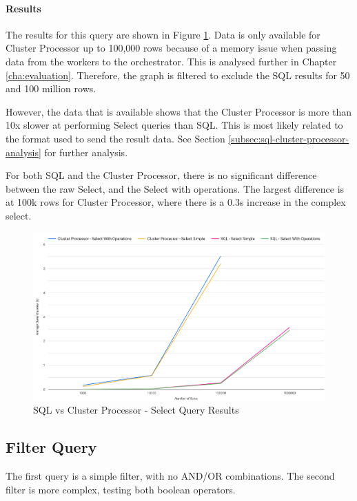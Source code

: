 \paragraph{Results} The results for this query are shown in Figure \ref{fig:select-graph}. Data is only available for Cluster Processor up to 100,000 rows because of a memory issue when passing data from the workers to the orchestrator. This is analysed further in Chapter \ref{cha:evaluation}. Therefore, the graph is filtered to exclude the SQL results for 50 and 100 million rows.

However, the data that is available shows that the Cluster Processor is more than 10x slower at performing Select queries than SQL. This is most likely related to the format used to send the result data. See Section \ref{subsec:sql-cluster-processor-analysis} for further analysis. 

For both SQL and the Cluster Processor, there is no significant difference between the raw Select, and the Select with operations. The largest difference is at 100k rows for Cluster Processor, where there is a 0.3s increase in the complex select.

\begin{figure}[htp]
	\centering
	\includegraphics[width=0.8\linewidth]{chapters/diagrams/testing/select-simple-1k-1m}
	\caption{SQL vs Cluster Processor - Select Query Results}
	\label{fig:select-graph}
\end{figure}

\subsection{Filter Query}
The first query is a simple filter, with no AND/OR combinations. 
The second filter is more complex, testing both boolean operators. 

